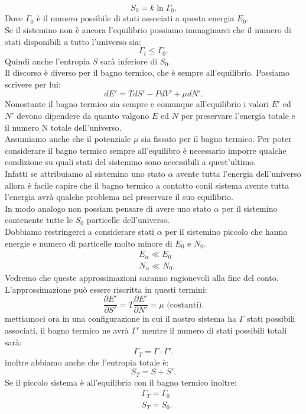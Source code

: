 \[
	S_0 = k \ln \Gamma_0
.\] 
Dove $\Gamma_0$ è il numero possibile di stati associati a questa energia $E_0$.\\
Se il sistemino non è ancora l'equilibrio possiamo immaginarci che il numero di stati disponibili a tutto l'universo sia:
\[
	\Gamma_{t}\le  \Gamma_0
.\] 
Quindi anche l'entropia $S$ sarà inferiore di  $S_0$.\\
Il discorso è diverso per il bagno termico, che è sempre all'equilibrio. Possiamo scrivere per lui:
\[
	dE' = TdS' -PdV' + \mu dN'
.\] 
Nonostante il bagno termico sia sempre e comunque all'equilibrio i valori $E'$ ed $N'$ devono dipendere da quanto valgono $E$ ed $N$ per preservare l'energia totale e il numero N totale dell'universo.\\
Assumiamo anche che il potenziale $\mu$ sia fissato per il bagno termico. Per poter considerare il bagno termico sempre all'equilibro è necessario imporre qualche condizione su quali stati del sistemino sono accessibili a quest'ultimo.\\
Infatti se attribuiamo al sistemino uno stato $\alpha$ avente tutta l'energia dell'universo allora è facile capire che il bagno termico a contatto conil sistema avente tutta l'energia avrà qualche problema nel preservare il suo equilibrio. \\
In modo analogo non possiam pensare di avere uno stato $\alpha$ per il sistemino contenente tutte le $S_0$ particelle dell'universo.\\
Dobbiamo restringerci a considerare stati $\alpha$ per il sistemino piccolo che hanno energie e numero di particelle molto minore di $E_0$ e $N_0$.
\begin{align}
	&E_{\alpha}\ll E_0\\
	&N_{\alpha}\ll N_0
.\end{align}
Vedremo che queste approssimazioni saranno ragionevoli alla fine del conto.\\
L'approssimazione può essere riscritta in questi termini:
\[
	\frac{\partial E'}{\partial S'} = T \frac{\partial E'}{\partial N'} = \mu \text{ (costanti)}
.\] 
mettiamoci ora in una configurazione in cui il nostro sistema ha $\Gamma$ stati possibili associati, il bagno termico ne avrà $\Gamma'$ mentre il numero di stati possibili totali sarà:
\[
	\Gamma_{T}= \Gamma\cdot \Gamma'
.\] 
inoltre abbiamo anche che l'entropia totale è:
\[
	S_{T}= S+ S'
.\] 
Se il piccolo sistema è all'equilibrio con il bagno termico inoltre:
\begin{align}
	&\Gamma_{T}=\Gamma_0\\
	&S_{T}= S_0
.\end{align}
